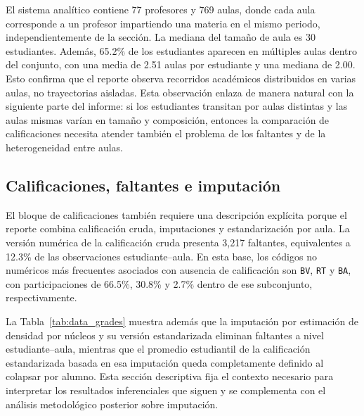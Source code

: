 \documentclass[10pt,letterpaper]{article} %
\numberwithin{figure}{subsection}
\begin{document}
El sistema analítico contiene 77 profesores y 769 aulas, donde cada aula corresponde a un profesor impartiendo una materia en el mismo periodo, independientemente de la sección. La mediana del tamaño de aula es 30 estudiantes. Además, 65.2\% de los estudiantes aparecen en múltiples aulas dentro del conjunto, con una media de 2.51 aulas por estudiante y una mediana de 2.00. Esto confirma que el reporte observa recorridos académicos distribuidos en varias aulas, no trayectorias aisladas. Esta observación enlaza de manera natural con la siguiente parte del informe: si los estudiantes transitan por aulas distintas y las aulas mismas varían en tamaño y composición, entonces la comparación de calificaciones necesita atender también el problema de los faltantes y de la heterogeneidad entre aulas.

\subsection{Calificaciones, faltantes e imputación}
El bloque de calificaciones también requiere una descripción explícita porque el reporte combina calificación cruda, imputaciones y estandarización por aula. La versión numérica de la calificación cruda presenta 3{,}217 faltantes, equivalentes a 12.3\% de las observaciones estudiante--aula. En esta base, los códigos no numéricos más frecuentes asociados con ausencia de calificación son \texttt{BV}, \texttt{RT} y \texttt{BA}, con participaciones de 66.5\%, 30.8\% y 2.7\% dentro de ese subconjunto, respectivamente.

La Tabla~\ref{tab:data_grades} muestra además que la imputación por estimación de densidad por núcleos y su versión estandarizada eliminan faltantes a nivel estudiante--aula, mientras que el promedio estudiantil de la calificación estandarizada basada en esa imputación queda completamente definido al colapsar por alumno. Esta sección descriptiva fija el contexto necesario para interpretar los resultados inferenciales que siguen y se complementa con el análisis metodológico posterior sobre imputación.

\begin{table}[!htbp]
    \centering
    \caption{Resumen de variables de calificación utilizadas en el proceso analítico.}
    \label{tab:data_grades}
    
\end{table}

\begin{table}[!htbp]
    \centering
    \caption{Tokens no numéricos observados en la calificación cruda.}
    \label{tab:data_grade_tokens}
    
\end{table}
\end{document}
